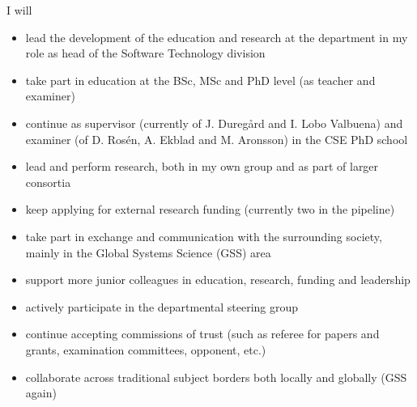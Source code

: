 \documentclass[11pt,twoside,twocolumn]{article}
\begin{document}
I will
\begin{itemize}
\item lead the development of the education and research at the
  department in my role as head of the Software Technology division

\item take part in education at the BSc, MSc and PhD level (as
  teacher and examiner)

\item continue as supervisor (currently of J. Duregård and I. Lobo
  Valbuena) and examiner (of D. Rosén, A. Ekblad and M. Aronsson) in
  the CSE PhD school

\item lead and perform research, both in my own group and as part of
  larger consortia

\item keep applying for external research funding (currently two
  in the pipeline)

\item take part in exchange and communication with the surrounding
  society, mainly in the Global Systems Science (GSS) area

\item support more junior colleagues in education, research, funding
  and leadership

\item actively participate in the departmental steering group

\item continue accepting commissions of trust (such as referee for
  papers and grants, examination committees, opponent, etc.)

\item collaborate across traditional subject borders both locally and
  globally (GSS again)
\end{itemize}




\renewcommand{\bibfont}{\small}

%

\end{document}

